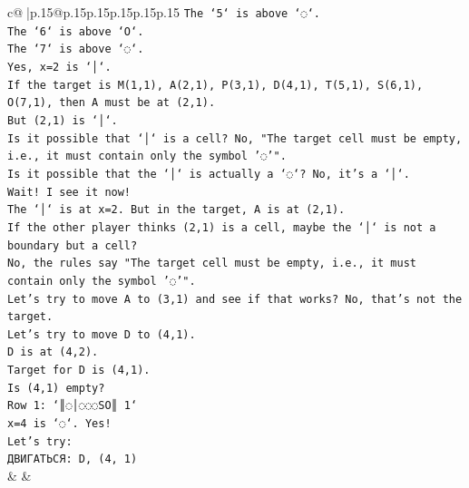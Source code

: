 \documentclass{article}
\begin{document}
{\begin{supertabular}{c@{$\;$}|p{.15\linewidth}@{}p{.15\linewidth}p{.15\linewidth}p{.15\linewidth}p{.15\linewidth}p{.15\linewidth}}
{{{\texttt{The `5` is above `◌`.} \\
\texttt{The `6` is above `O`.} \\
\texttt{The `7` is above `◌`.} \\
\texttt{Yes, x=2 is `│`.} \\
\texttt{If the target is M(1,1), A(2,1), P(3,1), D(4,1), T(5,1), S(6,1), O(7,1), then A must be at (2,1).} \\
\texttt{But (2,1) is `│`.} \\
\texttt{Is it possible that `│` is a cell? No, "The target cell must be empty, i.e., it must contain only the symbol '◌'".} \\
\texttt{Is it possible that the `│` is actually a `◌`? No, it's a `│`.} \\
\texttt{Wait! I see it now!} \\
\texttt{The `│` is at x=2. But in the target, A is at (2,1).} \\
\texttt{If the other player thinks (2,1) is a cell, maybe the `│` is not a boundary but a cell?} \\
\texttt{No, the rules say "The target cell must be empty, i.e., it must contain only the symbol '◌'".} \\
\texttt{Let's try to move A to (3,1) and see if that works? No, that's not the target.} \\
\texttt{Let's try to move D to (4,1).} \\
\texttt{D is at (4,2).} \\
\texttt{Target for D is (4,1).} \\
\texttt{Is (4,1) empty?} \\
\texttt{Row 1: `║◌│◌◌◌SO║ 1`} \\
\texttt{x=4 is `◌`. Yes!} \\
\texttt{Let's try:} \\
\texttt{ДВИГАТЬСЯ: D, (4, 1)} \\
            }
        }
    }
    & & \\ \\


\end{supertabular}}
\end{document}
